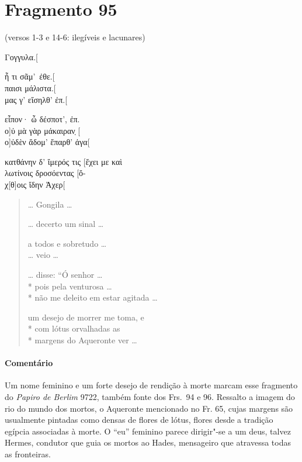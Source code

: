 {\section{Fragmento 95}

\begin{gkverse}
\textnormal{(versos 1-3 e 14-6: ilegíveis e lacunares)}

Γογγυλα.[

ἦ τι σᾶμ’ ἐθε.[\\
παισι μάλιστα.[\\
μας γ’ εἴσηλθ’ ἐπ.[

εἶπον· ὦ δέσποτ’, ἐπ.\\
ο]ὐ μὰ γὰρ μάκαιραν̣ [\\
ο]ὐδὲν ἄδομ’ ἔπαρθ’ ἀγα[

κατθάνην δ’ ἴμερός τις [ἔχει με καὶ\\
λωτίνοις δροσόεντας [ὄ-\\
χ[θ]οις ἴδην Ἀχερ[
\end{gkverse}

\pagebreak
\begin{verse}
\ldots{} Gongila \ldots{}

\ldots{} decerto um sinal \ldots{}

a todos e sobretudo \ldots{}\\
\ldots{} veio \ldots{}

\ldots{} disse: “Ó senhor \ldots{}\\*
pois pela venturosa \ldots{}\\*
não me deleito em estar agitada \ldots{}

um desejo de morrer me toma, e\\*
com lótus orvalhadas as\\*
margens do Aqueronte ver \ldots{}
\end{verse}

{\paragraph{Comentário} Um nome feminino e um forte desejo de rendição à morte marcam esse fragmento do
\textit{Papiro de Berlim }9722, também fonte dos Frs.~94 e 96. Ressalto a imagem do
rio do mundo dos mortos, o Aqueronte mencionado no Fr. 65, cujas margens são usualmente pintadas
como densas de flores de lótus, flores desde a tradição egípcia associadas à morte. O “eu” feminino parece dirigir"-se a um deus,
talvez Hermes, condutor que guia os mortos ao Hades, mensageiro que atravessa todas as fronteiras.}

}
